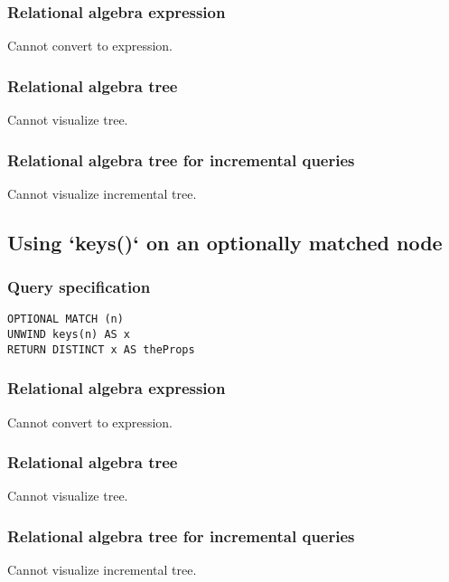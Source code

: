 \subsubsection*{Relational algebra expression}

Cannot convert to expression.

\subsubsection*{Relational algebra tree}

Cannot visualize tree.

\subsubsection*{Relational algebra tree for incremental queries}

Cannot visualize incremental tree.

\subsection{Using `keys()` on an optionally matched node}

\subsubsection*{Query specification}

\begin{lstlisting}
OPTIONAL MATCH (n)
UNWIND keys(n) AS x
RETURN DISTINCT x AS theProps
\end{lstlisting}

\subsubsection*{Relational algebra expression}

Cannot convert to expression.

\subsubsection*{Relational algebra tree}

Cannot visualize tree.

\subsubsection*{Relational algebra tree for incremental queries}

Cannot visualize incremental tree.

